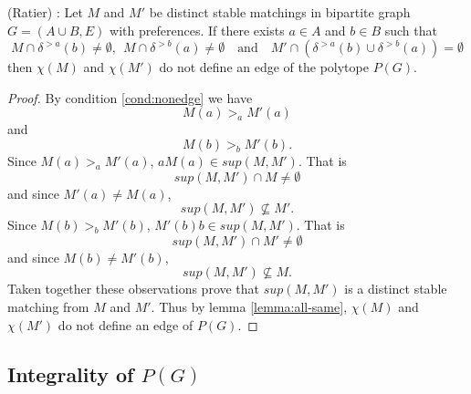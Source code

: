 \begin{corollary}\label{cor:edge} (Ratier) \cite{ratier1996stable}:
Let $M$ and $M'$ be distinct stable matchings in bipartite graph $G=(A\cup B, E)$ with preferences. If there exists $a \in A$ and $b \in B$ such that
\begin{equation}\label{cond:nonedge}
M \cap \delta^{>a}(b) \neq \emptyset,\ \ M\cap \delta^{>b}(a) \neq \emptyset \quad\text{and}\quad M' \cap(\delta^{>a}(b) \cup \delta^{>b}(a)) = \emptyset \end{equation}
then $\chi(M)$ and $\chi(M')$ do not define an edge of the polytope $P(G)$.
\end{corollary}
\begin{proof}
By condition \ref{cond:nonedge} we have $$M(a)>_a M'(a)$$ and $$M(b) >_b M'(b).$$
Since $M(a) >_a M'(a)$, $aM(a) \in sup(M,M')$. That is $$sup(M,M') \cap M \neq \emptyset$$ and since $M'(a) \neq M(a)$, 
$$sup(M,M') \not\subseteq M'.$$
Since $M(b) >_b M'(b)$, $M'(b)b \in sup(M,M')$. That is $$sup(M,M') \cap M' \neq \emptyset$$ and since $M(b) \neq M'(b)$,
$$sup(M,M') \not\subseteq M.$$
Taken together these observations prove that $sup(M,M')$ is a distinct stable matching from $M$ and $M'$. Thus by lemma \ref{lemma:all-same}, $\chi(M)$ and $\chi(M')$ do not define an edge of $P(G)$.  
\end{proof}
\subsection{Integrality of $P(G)$}
